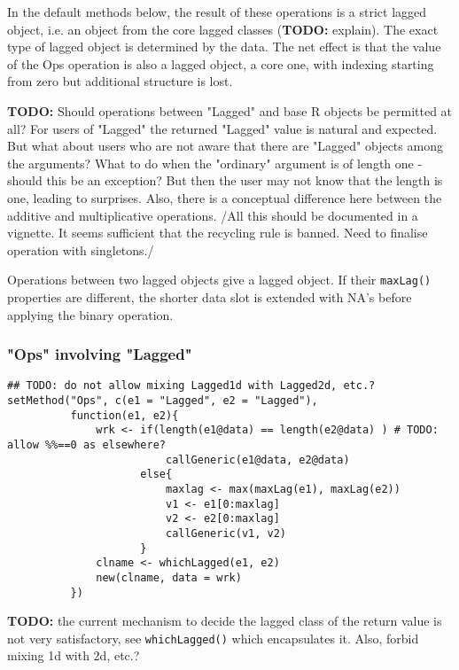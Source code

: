 \documentclass[11pt,a4paper]{article}
\begin{document}
In the default methods below, the result of these operations is a strict lagged object,
i.e. an object from the core lagged classes (\textbf{TODO:} explain). The exact type of lagged
object is determined by the data. The net effect is that the value of the Ops operation is
also a lagged object, a core one, with indexing starting from zero but additional structure
is lost.


\textbf{TODO:} Should operations between "Lagged" and base R objects be permitted at all?  For users
of "Lagged" the returned "Lagged" value is natural and expected. But what about users who are
not aware that there are "Lagged" objects among the arguments? What to do when the "ordinary"
argument is of length one - should this be an exception? But then the user may not know that
the length is one, leading to surprises. Also, there is a conceptual difference here between
the additive and multiplicative operations. /All this should be documented in a vignette. It
seems sufficient that the recycling rule is banned. Need to finalise operation with
singletons./


Operations between two lagged objects give a lagged object. If their \texttt{maxLag()} properties
are different, the shorter data slot is extended with NA's before applying the binary
operation.

\subsubsection{"Ops" involving "Lagged"}
\label{sec:orgb694449}

\begin{verbatim}
## TODO: do not allow mixing Lagged1d with Lagged2d, etc.?
setMethod("Ops", c(e1 = "Lagged", e2 = "Lagged"),
          function(e1, e2){
              wrk <- if(length(e1@data) == length(e2@data) ) # TODO: allow %%==0 as elsewhere?
                         callGeneric(e1@data, e2@data)
                     else{
                         maxlag <- max(maxLag(e1), maxLag(e2))
                         v1 <- e1[0:maxlag]
                         v2 <- e2[0:maxlag]
                         callGeneric(v1, v2)
                     }
              clname <- whichLagged(e1, e2)
              new(clname, data = wrk)
          })
\end{verbatim}
\textbf{TODO:} the current mechanism to decide the lagged class of the return value is not very
satisfactory, see \texttt{whichLagged()} which encapsulates it. Also, forbid mixing 1d with 2d,
etc.?
\end{document}
